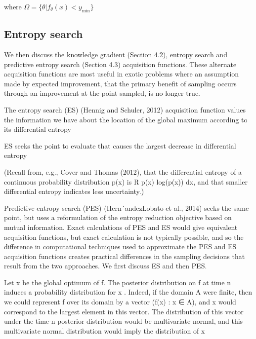 where $\Omega = \{\theta|f_{\theta}(x)< y_{\min}\}$


\subsection{Entropy search}
We then discuss the knowledge
gradient (Section 4.2), entropy search and predictive entropy search (Section 4.3) acquisition functions.
These alternate acquisition functions are most useful in exotic problems where an assumption made by
expected improvement, that the primary benefit of sampling occurs through an improvement at the point
sampled, is no longer true.


The entropy search (ES) (Hennig and Schuler, 2012) acquisition function values the information we have
about the location of the global maximum according to its differential entropy

ES seeks the point to evaluate that causes the largest decrease in differential entropy

(Recall from, e.g., Cover and Thomas (2012),
that the differential entropy of a continuous probability distribution p(x) is R
p(x) log(p(x)) dx, and that
smaller differential entropy indicates less uncertainty.)

Predictive entropy search (PES) (Hern´andezLobato et al., 2014) seeks the same point, but uses a reformulation of the entropy reduction objective
based on mutual information. Exact calculations of PES and ES would give equivalent acquisition functions, but exact calculation is not typically possible, and so the difference in computational techniques
used to approximate the PES and ES acquisition functions creates practical differences in the sampling
decisions that result from the two approaches. We first discuss ES and then PES.

Let x  be the global optimum of f. The posterior distribution on f at time n induces a probability
distribution for x
. Indeed, if the domain A were finite, then we could represent f over its domain by a
vector (f(x) : x ∈ A), and x
would correspond to the largest element in this vector. The distribution of
this vector under the time-n posterior distribution would be multivariate normal, and this multivariate
normal distribution would imply the distribution of x

